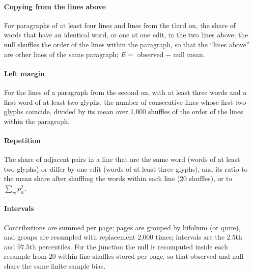 \paragraph{Copying from the lines above} For paragraphs of at least four lines and lines from the third on, the share of
words that have an identical word, or one at one edit, in the two lines above; the null shuffles the order of the lines
within the paragraph, so that the ``lines above'' are other lines of the same paragraph; $E = $ observed $-$ null mean.

\paragraph{Left margin} For the lines of a paragraph from the second on, with at least three words and a first word of at
least two glyphs, the number of consecutive lines whose first two glyphs coincide, divided by its mean over 1{,}000
shuffles of the order of the lines within the paragraph.

\paragraph{Repetition} The share of adjacent pairs in a line that are the same word (words of at least two glyphs) or
differ by one edit (words of at least three glyphs), and its ratio to the mean share after shuffling the words within
each line (20 shuffles), or to $\sum_w p_w^2$.

\paragraph{Intervals} Contributions are summed per page; pages are grouped by bifolium (or quire), and groups are
resampled with replacement 2{,}000 times; intervals are the 2.5th and 97.5th percentiles. For the junction the null is
recomputed inside each resample from 20 within-line shuffles stored per page, so that observed and null share the same
finite-sample bias.

